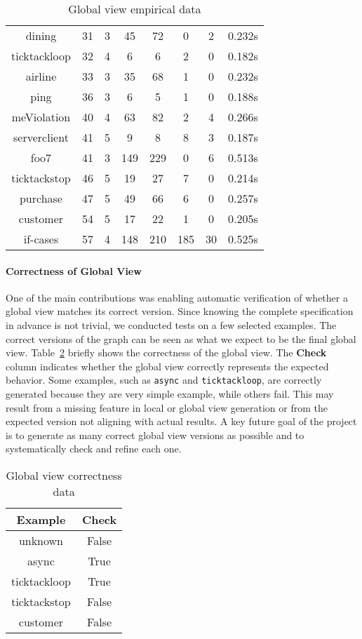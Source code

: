 \begin{table}[!ht]
\begin{tabular}{|c|c|c|c|c|c|c|c|}
dining & 31 & 3 & 45 & 72 & 0 & 2 & 0.232s \\ 
ticktackloop & 32 & 4 & 6 & 6 & 2 & 0 & 0.182s \\ 
airline & 33 & 3 & 35 & 68 & 1 & 0 & 0.232s \\ 
ping & 36 & 3 & 6 & 5 & 1 & 0 & 0.188s \\ 
meViolation & 40 & 4 & 63 & 82 & 2 & 4 & 0.266s \\ 
serverclient & 41 & 5 & 9 & 8 & 8 & 3 & 0.187s \\ 
foo7 & 41 & 3 & 149 & 229 & 0 & 6 & 0.513s \\ 
ticktackstop & 46 & 5 & 19 & 27 & 7 & 0 & 0.214s \\ 
purchase & 47 & 5 & 49 & 66 & 6 & 0 & 0.257s \\ 
customer & 54 & 5 & 17 & 22 & 1 & 0 & 0.205s \\ 
if-cases & 57 & 4 & 148 & 210 & 185 & 30 & 0.525s \\ 
\hline
\end{tabular}
\caption{Global view empirical data}
\label{tab:gvbench}
\end{table}

\paragraph{Correctness of Global View}
One of the main contributions was enabling automatic verification of whether a
global view matches its correct version. Since knowing the complete specification
in advance is not trivial, we conducted tests on a few selected examples. 
The correct versions of the graph can be seen as what we expect to be the final
global view.
Table~\ref{tab:corrbench} briefly shows the correctness of the global view. 
The \textbf{Check} column indicates whether the global view 
correctly represents the expected behavior. Some examples, such as 
\texttt{async} and \texttt{ticktackloop}, are correctly generated because they 
are very simple example, while others fail. This may result from a missing 
feature in local or global view generation or from
the expected version not aligning with actual results. A key future goal of the
project is to generate as many correct global view versions as possible and to
systematically check and refine each one.

\begin{table}[!ht]
\centering
\begin{tabular}{|c|c|}
\hline
Example & Check \\ 
\hline
unknown & False \\ 
async & True \\ 
ticktackloop & True \\ 
ticktackstop & False \\ 
customer & False \\ 
\hline
\end{tabular}
\caption{Global view correctness data}
\label{tab:corrbench}
\end{table}
